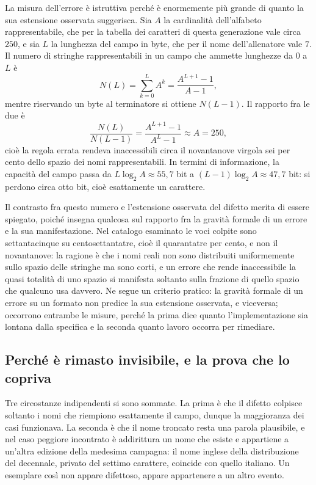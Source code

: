 La misura dell'errore è istruttiva perché è enormemente più grande di quanto la sua estensione osservata suggerisca. Sia $A$ la cardinalità dell'alfabeto rappresentabile, che per la tabella dei caratteri di questa generazione vale circa $250$, e sia $L$ la lunghezza del campo in byte, che per il nome dell'allenatore vale $7$. Il numero di stringhe rappresentabili in un campo che ammette lunghezze da $0$ a $L$ è
\begin{equation}
N(L) = \sum_{k=0}^{L} A^k = \frac{A^{L+1}-1}{A-1},
\end{equation}
mentre riservando un byte al terminatore si ottiene $N(L-1)$. Il rapporto fra le due è
\begin{equation}
\frac{N(L)}{N(L-1)} = \frac{A^{L+1}-1}{A^{L}-1} \approx A = 250 ,
\end{equation}
cioè la regola errata rendeva inaccessibili circa il novantanove virgola sei per cento dello spazio dei nomi rappresentabili. In termini di informazione, la capacità del campo passa da $L \log_2 A \approx 55{,}7$ bit a $(L-1)\log_2 A \approx 47{,}7$ bit: si perdono circa otto bit, cioè esattamente un carattere.

Il contrasto fra questo numero e l'estensione osservata del difetto merita di essere spiegato, poiché insegna qualcosa sul rapporto fra la gravità formale di un errore e la sua manifestazione. Nel catalogo esaminato le voci colpite sono settantacinque su centosettantatre, cioè il quarantatre per cento, e non il novantanove: la ragione è che i nomi reali non sono distribuiti uniformemente sullo spazio delle stringhe ma sono corti, e un errore che rende inaccessibile la quasi totalità di uno spazio si manifesta soltanto sulla frazione di quello spazio che qualcuno usa davvero. Ne segue un criterio pratico: la gravità formale di un errore su un formato non predice la sua estensione osservata, e viceversa; occorrono entrambe le misure, perché la prima dice quanto l'implementazione sia lontana dalla specifica e la seconda quanto lavoro occorra per rimediare.

\subsection*{Perché è rimasto invisibile, e la prova che lo copriva}

Tre circostanze indipendenti si sono sommate. La prima è che il difetto colpisce soltanto i nomi che riempiono esattamente il campo, dunque la maggioranza dei casi funzionava. La seconda è che il nome troncato resta una parola plausibile, e nel caso peggiore incontrato è addirittura un nome che esiste e appartiene a un'altra edizione della medesima campagna: il nome inglese della distribuzione del decennale, privato del settimo carattere, coincide con quello italiano. Un esemplare così non appare difettoso, appare appartenere a un altro evento.

